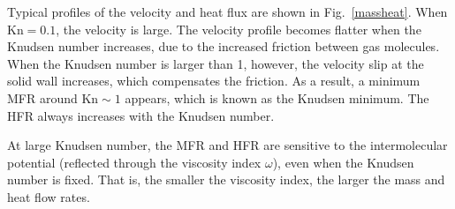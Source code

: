 Typical profiles of the velocity and heat flux are shown in Fig.~\ref{massheat}. When $\text{Kn}=0.1$, the velocity is large. The velocity profile becomes flatter when the Knudsen number increases, due to the increased friction between gas molecules. When the Knudsen number is larger than 1, however, the velocity slip at the solid wall increases, which compensates the friction. As a result, a minimum MFR around $\text{Kn}\sim1$ appears, which is known as the Knudsen minimum. 
  
The HFR always increases with the Knudsen number. 

At large Knudsen number, the MFR and HFR are sensitive to the intermolecular potential (reflected through the viscosity index $\omega$),  even when the Knudsen number is fixed. That is, the smaller the viscosity index, the larger the mass and heat flow rates. 

